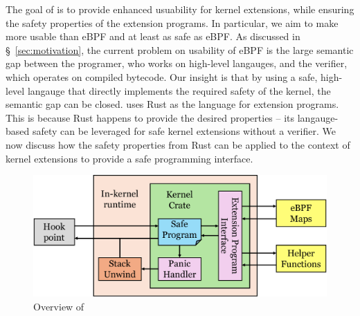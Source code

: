 The goal of \projname{} is to provide enhanced usuability for kernel extensions,
    while ensuring the safety properties of the extension programs.
In particular, we aim to make \projname{} more usable than eBPF and at least
    as safe as eBPF.
As discussed in \S~\ref{sec:motivation}, the current problem on usability of
    eBPF is the large semantic gap between the programer, who works on
    high-level langauges, and the verifier, which operates on compiled bytecode.
Our insight is that by using a safe, high-level langauge that directly
    implements the required safety of the kernel, the semantic gap can be
    closed.
\projname{} uses Rust as the language for extension programs.
This is because Rust happens to provide the desired properties -- its
    langauge-based safety can be leveraged for safe kernel extensions without a
    verifier.
We now discuss how the safety properties from Rust can be applied to the
    context of kernel extensions to provide a safe programming interface.

\begin{figure}
    \includegraphics[width=1.0\linewidth]{figs/overview.pdf}
    \centering
    \vspace{-10pt}
    \caption{Overview of \projname{}}
    \label{fig:rex-overview}
    \vspace{-10pt}
\end{figure}

